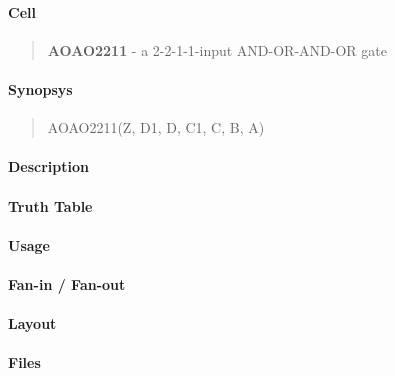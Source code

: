 \label{AOAO2211}
\paragraph{Cell}
\begin{quote}
    \textbf{AOAO2211} - a 2-2-1-1-input AND-OR-AND-OR gate
\end{quote}

\paragraph{Synopsys}
\begin{quote}
    AOAO2211(Z, D1, D, C1, C, B, A)
\end{quote}

\paragraph{Description}

%

\paragraph{Truth Table}
%

\paragraph{Usage}

\paragraph{Fan-in / Fan-out}

\paragraph{Layout}

\paragraph{Files}
